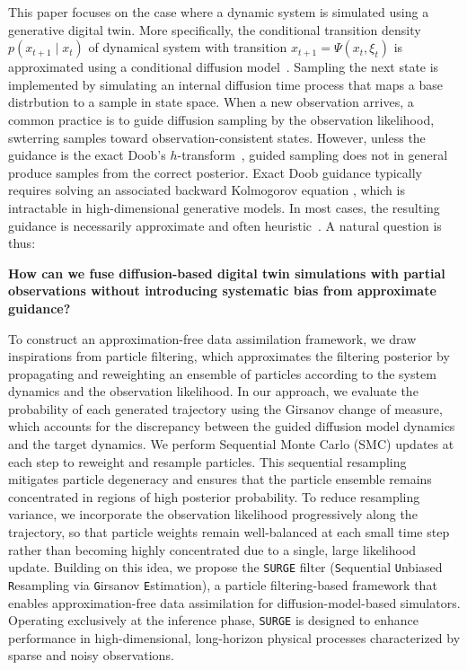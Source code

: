 \documentclass{article}
\theoremstyle{plain}
\theoremstyle{definition}
\theoremstyle{remark}
\begin{document}
This paper focuses on the case where a dynamic system is simulated using a generative digital twin. More specifically, the conditional transition density \( p(x_{t+1} \mid x_t) \) of dynamical system with transition $x_{t+1} = \Psi(x_t, \xi_t)$ is approximated using a conditional diffusion model~\cite{song2020score,lipman2022flow,liu2022flow,albergo2022building,albergo2025stochastic}. Sampling the next state is implemented by simulating an internal diffusion time process that maps a base distrbution to a sample in state space.
When a new observation arrives, a common practice is to guide diffusion sampling by the observation likelihood, swterring samples toward observation-consistent states.
However, unless the guidance is the exact Doob's $h$-transform~\cite{denker2024deft,tang2024stochastic,nguyen2025h,ren2025unified,sabour2025test,bao2025ensemble,domingo2024adjoint,havens2025adjoint,liu2025adjoint,zhu2026training}, guided sampling does not in general produce samples from the correct posterior. Exact Doob guidance typically requires solving an associated backward Kolmogorov equation \cite{albergo2024nets,zhang2023optimal}, which is intractable in high-dimensional generative models. In most cases, the resulting guidance is necessarily approximate and often heuristic~\cite{ren2025driftlite,chen2025flowdas}. A natural question is thus:
\begin{center}
    \textbf{How can we fuse diffusion-based digital twin simulations with partial observations without introducing systematic bias from approximate guidance?}
\end{center}

To construct an approximation-free data assimilation framework, we draw inspirations from particle filtering, which approximates the filtering posterior by propagating and reweighting an ensemble of particles according to the system dynamics and the observation likelihood. In our approach, we evaluate the probability of each generated trajectory using the Girsanov change of measure, which accounts for the discrepancy between the guided diffusion model dynamics and the target dynamics. We perform Sequential Monte Carlo (SMC) updates at each step to reweight and resample particles. This sequential resampling mitigates particle degeneracy and ensures that the particle ensemble remains concentrated in regions of high posterior probability. To reduce resampling variance, we incorporate the observation likelihood progressively along the trajectory, so that particle weights remain well-balanced at each small time step rather than becoming highly concentrated due to a single, large likelihood update. Building on this idea, we propose the \texttt{SURGE} filter (\texttt{S}equential \texttt{U}nbiased \texttt{R}esampling via \texttt{G}irsanov \texttt{E}stimation), a particle filtering-based framework that enables approximation-free data assimilation for diffusion-model-based simulators. Operating exclusively at the inference phase, \texttt{SURGE} is designed to enhance performance in high-dimensional, long-horizon physical processes characterized by sparse and noisy observations.
\end{document}
